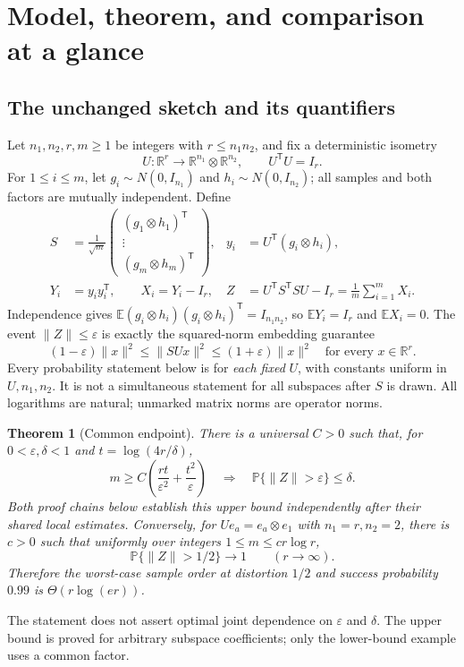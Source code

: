 \documentclass[11pt]{article}
\numberwithin{equation}{section}
\newtheorem{theorem}{Theorem}[section]
\theoremstyle{definition}\newtheorem{definition}[theorem]{Definition}
\theoremstyle{remark}\newtheorem{remark}[theorem]{Remark}
\newcommand{\R}{\mathbb R}\newcommand{\E}{\mathbb E}\newcommand{\Prob}{\mathbb P}
\newcommand{\norm}[1]{\lVert#1\rVert}\newcommand{\ip}[2]{\langle#1,#2\rangle}
\begin{document}
\section{Model, theorem, and comparison at a glance}\label{sec:model}
\subsection{The unchanged sketch and its quantifiers}
Let $n_1,n_2,r,m\ge1$ be integers with $r\le n_1n_2$, and fix a deterministic isometry
\[
 U:\R^r\longrightarrow\R^{n_1}\otimes\R^{n_2},\qquad U^{\mathsf T}U=I_r.
\]
For $1\le i\le m$, let $g_i\sim N(0,I_{n_1})$ and $h_i\sim N(0,I_{n_2})$;
all samples and both factors are mutually independent. Define
\begin{equation}\label{eq:model}
 \begin{aligned}
 S&=\frac1{\sqrt m}\begin{pmatrix}(g_1\otimes h_1)^{\mathsf T}\\\vdots\\(g_m\otimes h_m)^{\mathsf T}\end{pmatrix},
 &y_i&=U^{\mathsf T}(g_i\otimes h_i),\\
 Y_i&=y_iy_i^{\mathsf T},\qquad X_i=Y_i-I_r,
 &Z&=U^{\mathsf T}S^{\mathsf T}SU-I_r=\frac1m\sum_{i=1}^mX_i.
 \end{aligned}
\end{equation}
Independence gives $\E(g_i\otimes h_i)(g_i\otimes h_i)^{\mathsf T}=I_{n_1n_2}$,
so $\E Y_i=I_r$ and $\E X_i=0$.
The event $\norm Z\le\varepsilon$ is exactly the squared-norm embedding guarantee
\[
 (1-\varepsilon)\norm x^2\le\norm{SUx}^2\le(1+\varepsilon)\norm x^2
 \quad\text{for every }x\in\R^r.
\]
Every probability statement below is for \emph{each fixed} $U$, with constants uniform
in $U,n_1,n_2$. It is not a simultaneous statement for all subspaces after $S$ is drawn.
All logarithms are natural; unmarked matrix norms are operator norms.

\begin{theorem}[Common endpoint]\label{thm:common-endpoint}
There is a universal $C>0$ such that, for $0<\varepsilon,\delta<1$ and
$t=\log(4r/\delta)$,
\begin{equation}\label{eq:main-size}
 m\ge C\left(\frac{rt}{\varepsilon^2}+\frac{t^2}{\varepsilon}\right)
 \quad\Longrightarrow\quad\Prob\{\norm Z>\varepsilon\}\le\delta.
\end{equation}
Both proof chains below establish this upper bound independently after their shared
local estimates. Conversely, for $Ue_a=e_a\otimes e_1$ with $n_1=r,n_2=2$, there is
$c>0$ such that uniformly over integers $1\le m\le c r\log r$,
\[
 \Prob\{\norm Z>1/2\}\longrightarrow1\qquad(r\longrightarrow\infty).
\]
Therefore the worst-case sample order at distortion $1/2$ and success probability
$0.99$ is $\Theta(r\log(er))$.
\end{theorem}
The statement does not assert optimal joint dependence on $\varepsilon$ and $\delta$.
The upper bound is proved for arbitrary subspace coefficients; only the lower-bound
example uses a common factor.
\end{document}
